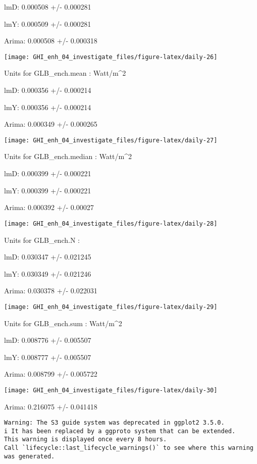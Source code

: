 \documentclass[
  10pt,
  a4paper,oneside]{article}
\begin{document}
lmD: 0.000508 +/- 0.000281

lmY: 0.000509 +/- 0.000281

Arima: 0.000508 +/- 0.000318

\begin{center}\texttt{[image: GHI\_enh\_04\_investigate\_files/figure-latex/daily-26]} \end{center}

Units for GLB\_ench.mean : Watt/m\^{}2

lmD: 0.000356 +/- 0.000214

lmY: 0.000356 +/- 0.000214

Arima: 0.000349 +/- 0.000265

\begin{center}\texttt{[image: GHI\_enh\_04\_investigate\_files/figure-latex/daily-27]} \end{center}

Units for GLB\_ench.median : Watt/m\^{}2

lmD: 0.000399 +/- 0.000221

lmY: 0.000399 +/- 0.000221

Arima: 0.000392 +/- 0.00027

\begin{center}\texttt{[image: GHI\_enh\_04\_investigate\_files/figure-latex/daily-28]} \end{center}

Units for GLB\_ench.N :

lmD: 0.030347 +/- 0.021245

lmY: 0.030349 +/- 0.021246

Arima: 0.030378 +/- 0.022031

\begin{center}\texttt{[image: GHI\_enh\_04\_investigate\_files/figure-latex/daily-29]} \end{center}

Units for GLB\_ench.sum : Watt/m\^{}2

lmD: 0.008776 +/- 0.005507

lmY: 0.008777 +/- 0.005507

Arima: 0.008799 +/- 0.005722

\begin{center}\texttt{[image: GHI\_enh\_04\_investigate\_files/figure-latex/daily-30]} \end{center}

Arima: 0.216075 +/- 0.041418

\begin{verbatim}
Warning: The S3 guide system was deprecated in ggplot2 3.5.0.
i It has been replaced by a ggproto system that can be extended.
This warning is displayed once every 8 hours.
Call `lifecycle::last_lifecycle_warnings()` to see where this warning was generated.
\end{verbatim}
\end{document}
